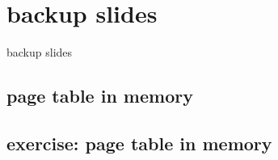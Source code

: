 


\section{backup slides}
\begin{frame}{backup slides}
\end{frame}

\subsection{page table in memory}



\subsection{exercise: page table in memory}





